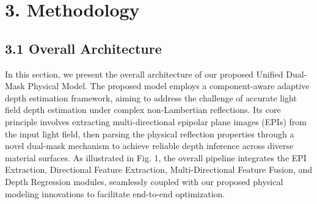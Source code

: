 \section{3. Methodology}

\subsection{3.1 Overall Architecture}

In this section, we present the overall architecture of our proposed Unified Dual-Mask Physical Model. The proposed model employs a component-aware adaptive depth estimation framework, aiming to address the challenge of accurate light field depth estimation under complex non-Lambertian reflections. Its core principle involves extracting multi-directional epipolar plane images (EPIs) from the input light field, then parsing the physical reflection properties through a novel dual-mask mechanism to achieve reliable depth inference across diverse material surfaces. As illustrated in Fig. 1, the overall pipeline integrates the EPI Extraction, Directional Feature Extraction, Multi-Directional Feature Fusion, and Depth Regression modules, seamlessly coupled with our proposed physical modeling innovations to facilitate end-to-end optimization.

